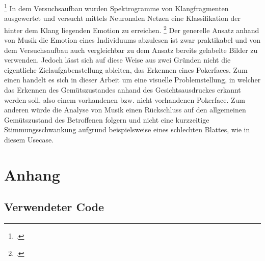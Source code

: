 \documentclass[12pt, a4paper]{report}
\begin{document}
\footcite[Vgl. ][Abstract]{EmotionInSound}
In dem Versuchsaufbau wurden Spektrogramme von Klangfragmenten ausgewertet und versucht mittels Neuronalen Netzen eine Klassifikation der hinter dem Klang liegenden Emotion zu erreichen.
\footcite[Vgl. ][Abstract]{EmotionInSound}
Der generelle Ansatz anhand von Musik die Emotion eines Individuums abzulesen ist zwar praktikabel und von dem Versuchsaufbau auch vergleichbar zu dem Ansatz bereits gelabelte Bilder zu verwenden. Jedoch lässt sich auf diese Weise aus zwei Gründen nicht die eigentliche Zielaufgabenstellung ableiten, das Erkennen eines Pokerfaces. Zum einen handelt es sich in dieser Arbeit um eine visuelle Problemstellung, in welcher das Erkennen des Gemütszustandes anhand des Gesichtsausdruckes erkannt werden soll, also einem vorhandenen bzw. nicht vorhandenen Pokerface. Zum anderen würde die Analyse von Musik einen Rückschluss auf den allgemeinen Gemütszustand des Betroffenen folgern und nicht eine kurzzeitige Stimmungsschwankung aufgrund beispielsweise eines schlechten Blattes, wie in diesem Usecase.

\let\cleardoublepage\relax
\newpage

\printbibheading
\printbibliography[type=book,heading=subbibliography,title={Literaturquellen}]
\pagestyle{empty}
\printbibliography[type=misc,heading=subbibliography,title={Sonstige Quellen}]
\pagestyle{empty}
\newpage
\pagestyle{empty}

\chapter*{Anhang}
\section*{Verwendeter Code}
  
  
  \newpage
  
  \newpage
  
  \newpage
  
  \newpage
  
  \newpage
  
  \newpage
  
  \newpage
\end{document}
